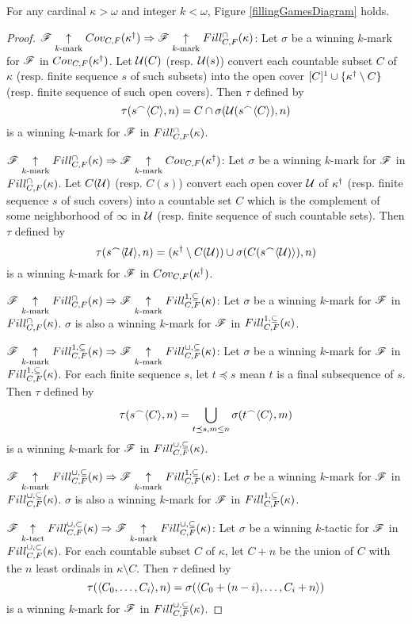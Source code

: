 \begin{thm}
For any cardinal $\kappa>\omega$ and integer $k<\omega$,
Figure \ref{fillingGamesDiagram} holds.
\end{thm}

\begin{proof}
  $\mathscr{F} \underset{k\text{-mark}}{\uparrow}Cov_{C,F}(\kappa^\dagger)
    \Rightarrow
  \mathscr{F} \underset{k\text{-mark}}{\uparrow}Fill^{\cap}_{C,F}(\kappa)$:
  Let $\sigma$ be a winning $k$-mark for $\mathscr{F}$ in
  $Cov_{C,F}(\kappa^\dagger)$. Let $\mathcal{U}(C)$ (resp. $\mathcal{U}(s)$) convert each
  countable subset $C$ of $\kappa$ (resp. finite sequence $s$ of such subsets)
  into the open cover $[C]^1\cup\{\kappa^\dagger\setminus C\}$
  (resp. finite sequence of such open covers). Then $\tau$ defined by
    \[
      \tau(s{^\frown}\langle C\rangle,n)
        =
      C\cap\sigma(\mathcal{U}(s{^\frown}\langle C\rangle),n)
    \]
  is a winning $k$-mark for $\mathscr{F}$ in $Fill^{\cap}_{C,F}(\kappa)$.

  $\mathscr{F} \underset{k\text{-mark}}{\uparrow}Fill^{\cap}_{C,F}(\kappa)
    \Rightarrow
  \mathscr{F} \underset{k\text{-mark}}{\uparrow}Cov_{C,F}(\kappa^\dagger)$:
  Let $\sigma$ be a winning $k$-mark for $\mathscr{F}$ in
  $Fill^{\cap}_{C,F}(\kappa)$. Let $C(\mathcal{U})$ (resp. $C(s)$) convert each open
  cover $\mathcal{U}$ of $\kappa^\dagger$ (resp. finite sequence $s$ of such covers)
  into a countable set $C$ which is the complement of some neighborhood of
  $\infty$ in $\mathcal{U}$ (resp. finite sequence of such countable sets).
  Then $\tau$ defined by
    \[
      \tau(s{^\frown}\langle\mathcal{U}\rangle,n)
        =
      (\kappa^\dagger\setminus C(\mathcal{U}))
        \cup
      \sigma(C(s{^\frown}\langle\mathcal{U})\rangle),n)
    \]
  is a winning $k$-mark for $\mathscr{F}$ in $Cov_{C,F}(\kappa^\dagger)$.

  $\mathscr{F} \underset{k\text{-mark}}{\uparrow}Fill^{\cap}_{C,F}(\kappa)
    \Rightarrow
  \mathscr{F} \underset{k\text{-mark}}{\uparrow}Fill^{1,\subseteq}_{C,F}(\kappa)$:
  Let $\sigma$ be a winning $k$-mark for $\mathscr{F}$ in
  $Fill^{\cap}_{C,F}(\kappa)$. $\sigma$ is also a winning $k$-mark for $\mathscr{F}$
  in $Fill^{1,\subseteq}_{C,F}(\kappa)$.

  $\mathscr{F} \underset{k\text{-mark}}{\uparrow}Fill^{1,\subseteq}_{C,F}(\kappa)
    \Rightarrow
  \mathscr{F} \underset{k\text{-mark}}{\uparrow}Fill^{\cup,\subseteq}_{C,F}(\kappa)$: Let $\sigma$ be a winning $k$-mark for $\mathscr{F}$ in
  $Fill^{1,\subseteq}_{C,F}(\kappa)$. For each finite sequence $s$, let $t\preceq s$ mean $t$
  is a final subsequence of $s$. Then $\tau$ defined by
    \[
      \tau(s{^\frown}\langle C\rangle,n)
        =
      \bigcup_{t\preceq s, m\leq n}
      \sigma(t{^\frown}\langle C\rangle,m)
    \]
  is a winning $k$-mark for $\mathscr{F}$ in $Fill^{\cup,\subseteq}_{C,F}(\kappa)$.

  $\mathscr{F} \underset{k\text{-mark}}{\uparrow}Fill^{\cup,\subseteq}_{C,F}(\kappa)
    \Rightarrow
  \mathscr{F} \underset{k\text{-mark}}{\uparrow}Fill^{1,\subseteq}_{C,F}(\kappa)$:
  Let $\sigma$ be a winning $k$-mark for $\mathscr{F}$ in
  $Fill^{\cup,\subseteq}_{C,F}(\kappa)$. $\sigma$ is also a winning $k$-mark for $\mathscr{F}$
  in $Fill^{1,\subseteq}_{C,F}(\kappa)$.

  $\mathscr{F} \underset{k\text{-tact}}{\uparrow}Fill^{\cup,\subset}_{C,F}(\kappa)
    \Rightarrow
  \mathscr{F} \underset{k\text{-mark}}{\uparrow}Fill^{\cup,\subseteq}_{C,F}(\kappa)$:
  Let $\sigma$ be a winning $k$-tactic for $\mathscr{F}$ in
  $Fill^{\cup,\subset}_{C,F}(\kappa)$. For each countable subset $C$ of $\kappa$, let $C+n$
  be the union of $C$ with the $n$ least ordinals in $\kappa\setminus C$.
  Then $\tau$ defined by
    \[
      \tau(\langle C_0,\dots,C_i\rangle,n)
        =
      \sigma(\langle C_0+(n-i),\dots,C_i+n\rangle)
    \]
  is a winning $k$-mark for $\mathscr{F}$ in $Fill^{\cup,\subseteq}_{C,F}(\kappa)$.
\end{proof}

